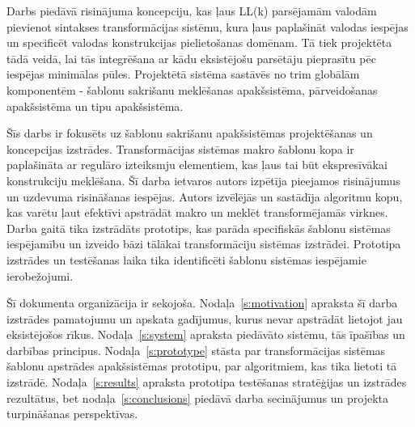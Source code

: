 Darbs piedāvā risinājuma koncepciju, kas ļaus LL(k) parsējamām valodām pievienot sintakses transformācijas sistēmu, kura ļaus paplašināt valodas iespējas un specificēt valodas konstrukcijas pielietošanas domēnam. Tā tiek projektēta tādā veidā, lai tās integrēšana ar kādu eksistējošu parsētāju pieprasītu pēc iespējas minimālas pūles. Projektētā sistēma sastāvēs no trim globālām komponentēm - šablonu sakrišanu meklēšanas apakšsistēma, pārveidošanas apakšsistēma un tipu apakšsistēma. %

Šīs darbs ir fokusēts uz šablonu sakrišanu apakšsistēmas projektēšanas un koncepcijas izstrādes. Transformācijas sistēmas makro šablonu kopa ir paplašināta ar regulāro izteiksmju elementiem, kas ļaus tai būt ekspresīvākai konstrukciju meklēšana. Šī darba ietvaros autors izpētīja pieejamos risinājumus un uzdevuma risināšanas iespējas. Autors izvēlējās un sastādīja algoritmu kopu, kas varētu ļaut efektīvi apstrādāt makro un meklēt transformējamās virknes. Darba gaitā tika izstrādāts prototips, kas parāda specifiskās šablonu sistēmas iespējamību un izveido bāzi tālākai transformāciju sistēmas izstrādei. Prototipa izstrādes un testēšanas laika tika identificēti šablonu sistēmas iespējamie ierobežojumi. 



Šī dokumenta organizācija ir sekojoša. Nodaļa~\ref{s:motivation} apraksta šī darba izstrādes pamatojumu un apskata gadījumus, kurus nevar apstrādāt lietojot jau eksistējošos rīkus. Nodaļa~\ref{s:system} apraksta piedāvāto sistēmu, tās īpašības un darbības principus. Nodaļa~\ref{s:prototype} stāsta par transformācijas sistēmas šablonu apstrādes apakšsistēmas prototipu, par algoritmiem, kas tika lietoti tā izstrādē. Nodaļa~\ref{s:results} apraksta prototipa testēšanas stratēģijas un izstrādes rezultātus, bet nodaļa~\ref{s:conclusions} piedāvā darba secinājumus un projekta turpināšanas perspektīvas.